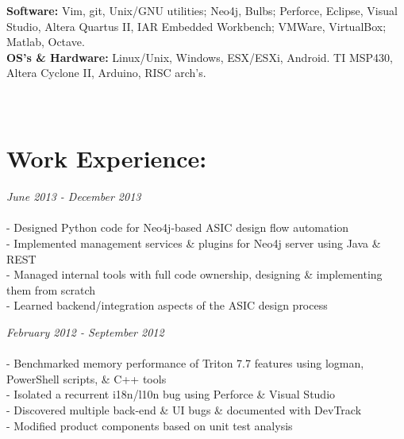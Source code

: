 \documentclass{article}
\begin{document}
\indent \textbf{Software:}
Vim, git, Unix/GNU utilities; Neo4j, Bulbs; Perforce, Eclipse, Visual Studio,
Altera Quartus II,  IAR Embedded
\indent \indent \hspace{34pt} Workbench; VMWare, VirtualBox; Matlab, Octave. \\

\indent \textbf{OS's \& Hardware:}
Linux/Unix, Windows, ESX/ESXi, Android. TI MSP430, Altera Cyclone II, Arduino,
RISC arch's.\\
\hfill\\
\hfill\\

\section*{Work Experience:}

\dotfill
\begin{spacing}{1.0}
 \hfill {\sl June 2013 - December 2013} \\
  \\
\indent \indent - Designed Python code for Neo4j-based ASIC design flow
automation \\
\indent \indent - Implemented management services \& plugins for Neo4j server
using Java \& REST\\
\indent \indent - Managed internal tools with full code ownership, designing \&
 implementing them from scratch\\
\indent \indent - Learned backend/integration aspects of the ASIC design
process
\end{spacing}

\dotfill
\begin{spacing}{1.0}
 \hfill {\sl February 2012 - September 2012} \\
  \\
\indent \indent - Benchmarked memory performance of Triton 7.7 features using logman, PowerShell scripts, \& C++ tools \\
\indent \indent - Isolated a recurrent i18n/l10n bug using Perforce \& Visual Studio\\
\indent \indent - Discovered multiple back-end \& UI bugs \& documented with DevTrack \\
\indent \indent - Modified product components based on unit test analysis
\end{spacing}
\dotfill
\end{document}
